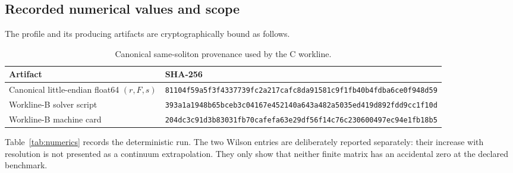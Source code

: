 \documentclass[11pt]{article}
\theoremstyle{definition}
\theoremstyle{remark}
\begin{document}
\subsection{Recorded numerical values and scope}

The profile and its producing artifacts are cryptographically bound as
follows.
\begin{table}[ht]
\centering
\scriptsize
\begin{tabular}{@{}L{0.24\textwidth}L{0.69\textwidth}@{}}
\toprule
Artifact & SHA-256\\
\midrule
Canonical little-endian float64 \((r,F,s)\)
 & \nolinkurl{81104f59a5f3f4337739fc2a217cafc8da91581c9f1fb40b4fdba6ce0f948d59}\\
Workline-B solver script
 & \nolinkurl{393a1a1948b65bceb3c04167e452140a643a482a5035ed419d892fdd9cc1f10d}\\
Workline-B machine card
 & \nolinkurl{204dc3c91d3b83031fb70cafefa63e29df56f14c76c230600497ec94e1fb18b5}\\
\bottomrule
\end{tabular}
\caption{Canonical same-soliton provenance used by the C workline.}
\label{tab:provenance}
\end{table}

Table~\ref{tab:numerics} records the deterministic run.  The two Wilson
entries are deliberately reported separately: their increase with resolution
is not presented as a continuum extrapolation.  They only show that neither
finite matrix has an accidental zero at the declared benchmark.
\end{document}
